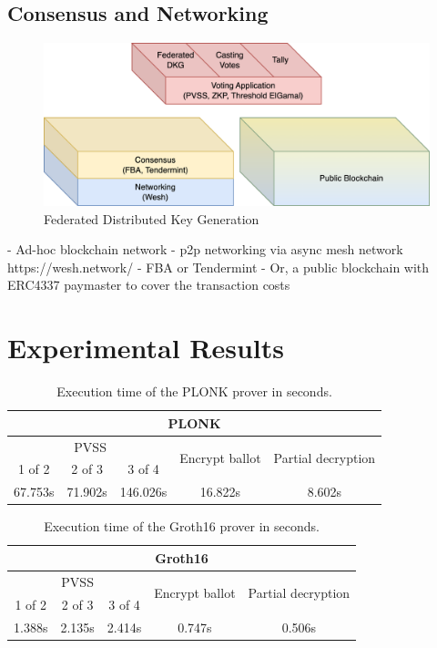 \documentclass{article}
\begin{document}
\subsection{Consensus and Networking}

\begin{figure}
    \centering
    \includegraphics[width=\textwidth]{stack-bc.png}
    \caption{Federated Distributed Key Generation}
    \label{fig:FDKG}
\end{figure}

- Ad-hoc blockchain network
- p2p networking via async mesh network https://wesh.network/
- FBA or Tendermint
- Or, a public blockchain with ERC4337 paymaster to cover the transaction costs

\section{Experimental Results}

\begin{table}
\centering
\label{table:plonk-time}
\caption{Execution time of the PLONK prover in seconds.}
\begin{tabular}{|c|c|c|c|c|}
    \hline
    \multicolumn{5}{|c|}{PLONK} \\
    \hline
    \multicolumn{3}{|c|}{PVSS} & \multirow{2}{*}{Encrypt ballot} & \multirow{2}{*}{Partial decryption} \\
    \cline{1-3}
    1 of 2 & 2 of 3 & 3 of 4 & & \\
    \hline
    67.753s & 71.902s & 146.026s & 16.822s & 8.602s\\
    \hline
\end{tabular}
\end{table}

\begin{table}
\centering
\label{table:groth16-time}
\caption{Execution time of the Groth16 prover in seconds.}
\begin{tabular}{|c|c|c|c|c|}
    \hline
    \multicolumn{5}{|c|}{Groth16} \\
    \hline
    \multicolumn{3}{|c|}{PVSS} & \multirow{2}{*}{Encrypt ballot} & \multirow{2}{*}{Partial decryption} \\
    \cline{1-3}
    1 of 2 & 2 of 3 & 3 of 4 & & \\
    \hline
    1.388s & 2.135s & 2.414s & 0.747s & 0.506s\\
    \hline
\end{tabular}
\end{table}
\end{document}
